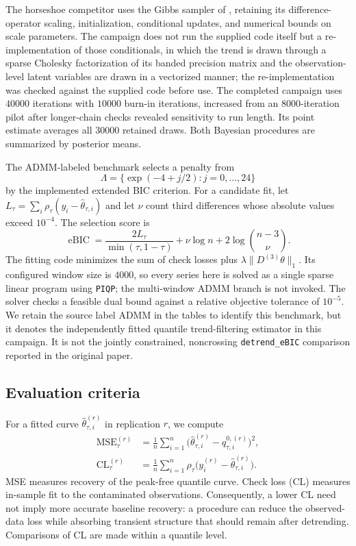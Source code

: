 The horseshoe competitor uses the Gibbs sampler of \citet{onizuka2024fast}, retaining its difference-operator scaling, initialization, conditional updates, and numerical bounds on scale parameters. The campaign does not run the supplied code itself but a re-implementation of those conditionals, in which the trend is drawn through a sparse Cholesky factorization of its banded precision matrix and the observation-level latent variables are drawn in a vectorized manner; the re-implementation was checked against the supplied code before use. The completed campaign uses $40000$ iterations with $10000$ burn-in iterations, increased from an $8000$-iteration pilot after longer-chain checks revealed sensitivity to run length. Its point estimate averages all $30000$ retained draws. Both Bayesian procedures are summarized by posterior means.

The ADMM-labeled benchmark selects a penalty from
\[
 \Lambda=\{\exp(-4+j/2):j=0,\ldots,24\}
\]
by the implemented extended BIC criterion. For a candidate fit, let $L_\tau=\sum_i\rho_\tau(y_i-\widehat\theta_{\tau,i})$ and let $\nu$ count third differences whose absolute values exceed $10^{-4}$. The selection score is
\begin{equation}
 \operatorname{eBIC}=\frac{2L_\tau}{\min(\tau,1-\tau)}
       +\nu\log n+2\log\binom{n-3}{\nu}.
 \label{eq:air_ebic}
\end{equation}
The fitting code minimizes the sum of check losses plus $\lambda\|D^{(3)}\theta\|_1$. Its configured window size is $4000$, so every series here is solved as a single sparse linear program using \texttt{PIQP}; the multi-window ADMM branch is not invoked. The solver checks a feasible dual bound against a relative objective tolerance of $10^{-5}$. We retain the source label ADMM in the tables to identify this benchmark, but it denotes the independently fitted quantile trend-filtering estimator in this campaign. It is not the jointly constrained, noncrossing \texttt{detrend\_eBIC} comparison reported in the original paper.

\subsection{Evaluation criteria}
\label{subsec:air_metrics}

For a fitted curve $\widehat\theta_{\tau,i}^{(r)}$ in replication $r$, we compute
\begin{align}
 \operatorname{MSE}^{(r)}_\tau
  &=\frac{1}{n}\sum_{i=1}^n
    \bigl(\widehat\theta_{\tau,i}^{(r)}-q_{\tau,i}^{0,(r)}\bigr)^2,
    \label{eq:air_mse}\\
 \operatorname{CL}^{(r)}_\tau
  &=\frac{1}{n}\sum_{i=1}^n
    \rho_\tau\!\bigl(y_i^{(r)}-\widehat\theta_{\tau,i}^{(r)}\bigr).
    \label{eq:air_check_loss}
\end{align}
MSE measures recovery of the peak-free quantile curve. Check loss (CL) measures in-sample fit to the contaminated observations. Consequently, a lower CL need not imply more accurate baseline recovery: a procedure can reduce the observed-data loss while absorbing transient structure that should remain after detrending. Comparisons of CL are made within a quantile level.


